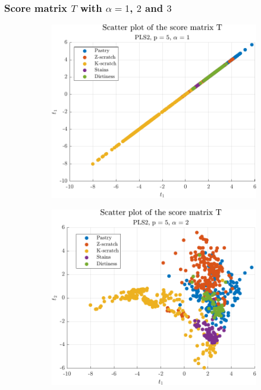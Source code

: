 \begin{frame}
	\frametitle{Score matrix $T$ with $\alpha = 1$, $2$ and $3$}
	\begin{figure}
		\begin{subfigure}[b]{0.70\textwidth}
			\includegraphics[width=\textwidth]{Images/scatter_T_a1_p5.pdf}
		\end{subfigure}
	\end{figure}
\end{frame}

\begin{frame}
	\begin{figure}
		\begin{subfigure}[b]{0.70\textwidth}
			\includegraphics[width=\textwidth]{Images/scatter_T_a2_p5.pdf}
		\end{subfigure}
	\end{figure}
\end{frame}

